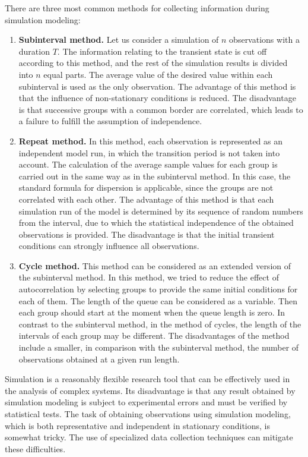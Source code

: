 \documentclass[12pt]{report}
\theoremstyle{definition}
\providecommand{\tightlist}{%
	\setlength{\itemsep}{0pt}\setlength{\parskip}{0pt}}
\begin{document}
There are three most common methods for collecting information during simulation modeling:
\begin{enumerate}
	\tightlist
	\item \textbf{Subinterval method.}
	Let us consider a simulation of $n$ observations with a duration $T$. 
	The information relating to the transient state is cut off according to this method, and the rest of the simulation results is divided into $n$ equal parts.
	The average value of the desired value within each subinterval is used as the only observation.
	The advantage of this method is that the influence of non-stationary conditions is reduced.
	The disadvantage is that successive groups with a common border are correlated, which leads to a failure to fulfill the assumption of independence.

	\item \textbf{Repeat method.}
	In this method, each observation is represented as an independent model run, in which the transition period is not taken into account.
	The calculation of the average sample values for each group is carried out in the same way as in the subinterval method.
	In this case, the standard formula for dispersion is applicable, since the groups are not correlated with each other.
	The advantage of this method is that each simulation run of the model is determined by its sequence of random numbers from the interval, due to which the statistical independence of the obtained observations is provided.
	The disadvantage is that the initial transient conditions can strongly influence all observations.
	
	\item \textbf{Cycle method.}
	This method can be considered as an extended version of the subinterval method.
	In this method, we tried to reduce the effect of autocorrelation by selecting groups to provide the same initial conditions for each of them.
	The length of the queue can be considered as a variable. 
	Then each group should start at the moment when the queue length is zero.
	In contrast to the subinterval method, in the method of cycles, the length of the intervals of each group may be different.
	The disadvantages of the method include a smaller, in comparison with the subinterval method, the number of observations obtained at a given run length.
\end{enumerate}

Simulation is a reasonably flexible research tool that can be effectively used in the analysis of complex systems.
Its disadvantage is that any result obtained by simulation modeling is subject to experimental errors and must be verified by statistical tests.
The task of obtaining observations using simulation modeling, which is both representative and independent in stationary conditions, is somewhat tricky.
The use of specialized data collection techniques can mitigate these difficulties.
\end{document}
